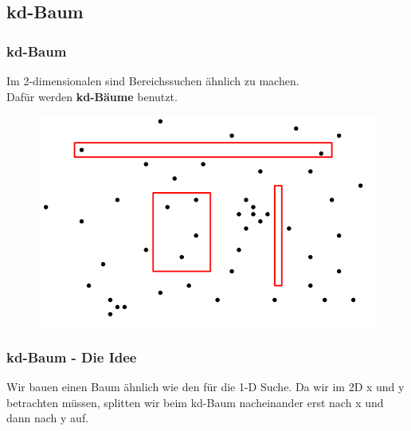 \subsection{kd-Baum}
\begin{frame}
	\frametitle{kd-Baum}
	Im 2-dimensionalen sind Bereichssuchen ähnlich zu machen. \\
	Dafür werden \textbf{kd-Bäume} benutzt.
	\begin{figure}[htbp]
	\begin{center}
  	\includegraphics[width=.8\linewidth]{bilder/2d.png}
	\end{center}
\end{figure}
\end{frame}

\begin{frame}
	\frametitle{kd-Baum - Die Idee}
	Wir bauen einen Baum ähnlich wie den für die 1-D Suche. Da wir im 2D x und y betrachten müssen, splitten wir beim kd-Baum nacheinander erst nach x und dann nach y auf.
\end{frame}

